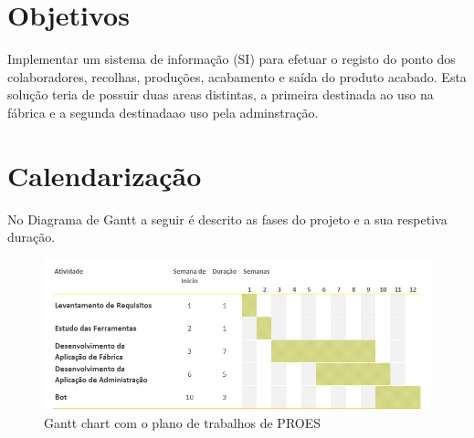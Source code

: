 \section{Objetivos}
Implementar um sistema de informação (SI\label{sym:SI}) para efetuar o registo do ponto dos colaboradores, recolhas, produções, acabamento e saída do produto acabado. Esta solução teria de possuir duas areas distintas, a primeira destinada ao uso na fábrica e a segunda destinadaao uso pela adminstração.

\section{Calendarização}
No Diagrama de Gantt a seguir é descrito as fases do projeto e a sua respetiva duração.

\begin{figure}[htbp] 
    \begin{center}
    \includegraphics[width=\textwidth,keepaspectratio]{figuras/DiagramaGant.jpg}
    \caption{Gantt chart com o plano de trabalhos de PROES\label{sym:PROES}}\label{fig:gantt chart} 
    \end{center}
\end{figure}

